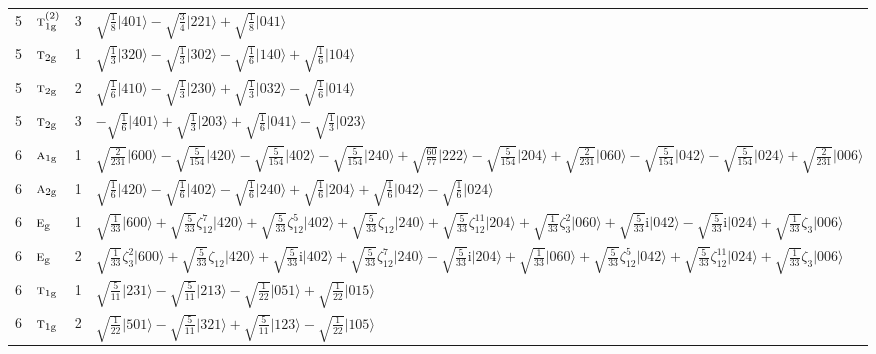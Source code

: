 \documentclass[11pt]{article}
\newcommand{\irr}[1]{\text{\normalfont\scshape #1}}
\newcommand{\ptag}[1]{\mathrm{#1}}
\newcommand{\iunit}{\mathrm{i}}
\newcommand{\rootunity}[1]{\zeta_{#1}}
\newcommand{\occ}[1]{\lvert #1\rangle}
\begin{document}
\begin{longtable}{c l c p{}}
5 & $\irr{t}_{1\ptag{g}}^{(2)}$ & 3 & $\sqrt{\tfrac{1}{8}}\occ{401}-\sqrt{\tfrac{3}{4}}\occ{221}+\sqrt{\tfrac{1}{8}}\occ{041}$\\
5 & $\irr{t}_{2\ptag{g}}$ & 1 & $\sqrt{\tfrac{1}{3}}\occ{320}-\sqrt{\tfrac{1}{3}}\occ{302}-\sqrt{\tfrac{1}{6}}\occ{140}+\sqrt{\tfrac{1}{6}}\occ{104}$\\
5 & $\irr{t}_{2\ptag{g}}$ & 2 & $\sqrt{\tfrac{1}{6}}\occ{410}-\sqrt{\tfrac{1}{3}}\occ{230}+\sqrt{\tfrac{1}{3}}\occ{032}-\sqrt{\tfrac{1}{6}}\occ{014}$\\
5 & $\irr{t}_{2\ptag{g}}$ & 3 & $-\sqrt{\tfrac{1}{6}}\occ{401}+\sqrt{\tfrac{1}{3}}\occ{203}+\sqrt{\tfrac{1}{6}}\occ{041}-\sqrt{\tfrac{1}{3}}\occ{023}$\\
\hline
6 & $\irr{a}_{1\ptag{g}}$ & 1 & $\sqrt{\tfrac{2}{231}}\occ{600}-\sqrt{\tfrac{5}{154}}\occ{420}-\sqrt{\tfrac{5}{154}}\occ{402}-\sqrt{\tfrac{5}{154}}\occ{240}+\sqrt{\tfrac{60}{77}}\occ{222}-\sqrt{\tfrac{5}{154}}\occ{204}+\sqrt{\tfrac{2}{231}}\occ{060}-\sqrt{\tfrac{5}{154}}\occ{042}-\sqrt{\tfrac{5}{154}}\occ{024}+\sqrt{\tfrac{2}{231}}\occ{006}$\\
6 & $\irr{a}_{2\ptag{g}}$ & 1 & $\sqrt{\tfrac{1}{6}}\occ{420}-\sqrt{\tfrac{1}{6}}\occ{402}-\sqrt{\tfrac{1}{6}}\occ{240}+\sqrt{\tfrac{1}{6}}\occ{204}+\sqrt{\tfrac{1}{6}}\occ{042}-\sqrt{\tfrac{1}{6}}\occ{024}$\\
6 & $\irr{e}_{\ptag{g}}$ & 1 & $\sqrt{\tfrac{1}{33}}\occ{600}+\sqrt{\tfrac{5}{33}}\rootunity{12}^{7}\occ{420}+\sqrt{\tfrac{5}{33}}\rootunity{12}^{5}\occ{402}+\sqrt{\tfrac{5}{33}}\rootunity{12}\occ{240}+\sqrt{\tfrac{5}{33}}\rootunity{12}^{11}\occ{204}+\sqrt{\tfrac{1}{33}}\rootunity{3}^{2}\occ{060}+\sqrt{\tfrac{5}{33}}\iunit\occ{042}-\sqrt{\tfrac{5}{33}}\iunit\occ{024}+\sqrt{\tfrac{1}{33}}\rootunity{3}\occ{006}$\\
6 & $\irr{e}_{\ptag{g}}$ & 2 & $\sqrt{\tfrac{1}{33}}\rootunity{3}^{2}\occ{600}+\sqrt{\tfrac{5}{33}}\rootunity{12}\occ{420}+\sqrt{\tfrac{5}{33}}\iunit\occ{402}+\sqrt{\tfrac{5}{33}}\rootunity{12}^{7}\occ{240}-\sqrt{\tfrac{5}{33}}\iunit\occ{204}+\sqrt{\tfrac{1}{33}}\occ{060}+\sqrt{\tfrac{5}{33}}\rootunity{12}^{5}\occ{042}+\sqrt{\tfrac{5}{33}}\rootunity{12}^{11}\occ{024}+\sqrt{\tfrac{1}{33}}\rootunity{3}\occ{006}$\\
6 & $\irr{t}_{1\ptag{g}}$ & 1 & $\sqrt{\tfrac{5}{11}}\occ{231}-\sqrt{\tfrac{5}{11}}\occ{213}-\sqrt{\tfrac{1}{22}}\occ{051}+\sqrt{\tfrac{1}{22}}\occ{015}$\\
6 & $\irr{t}_{1\ptag{g}}$ & 2 & $\sqrt{\tfrac{1}{22}}\occ{501}-\sqrt{\tfrac{5}{11}}\occ{321}+\sqrt{\tfrac{5}{11}}\occ{123}-\sqrt{\tfrac{1}{22}}\occ{105}$\\

\end{longtable}
\end{document}
